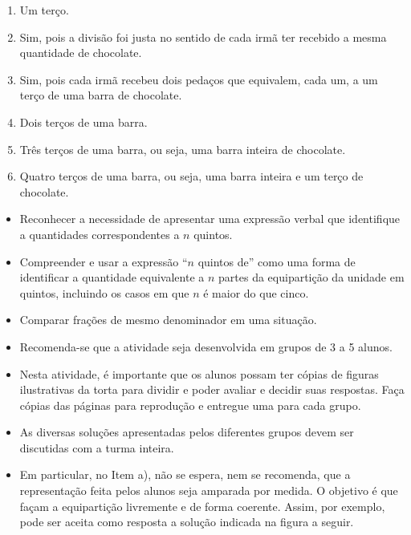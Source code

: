 \begin{multicols}{2}
\begin{solucao}{}{}
\begin{enumerate} [\quad a)] %
    \item  Um terço.
    \item  Sim, pois a divisão foi justa no sentido de cada irmã ter recebido a mesma quantidade de chocolate.
    \item  Sim, pois cada irmã recebeu dois pedaços que equivalem, cada um, a um terço de uma barra de chocolate.
    \item  Dois terços de uma barra.
    \item  Três terços de uma barra, ou seja, uma barra inteira de chocolate.
    \item  Quatro terços de uma barra, ou seja, uma barra inteira e um terço de chocolate.
\end{enumerate} %

\end{solucao}

\newpage
\begin{objetivos}{}{}
  \begin{itemize} %
\item Reconhecer a necessidade de apresentar uma expressão verbal que identifique a quantidades correspondentes a $n$ quintos.
\item Compreender e usar a expressão ``$n$ quintos de'' como uma forma de identificar a quantidade equivalente a $n$ partes da equipartição da unidade em quintos, incluindo os casos em que $n$ é maior do que cinco.
\item Comparar frações de mesmo denominador em uma situação.
\end{itemize} %
\end{objetivos}

\begin{orientacoes}
  \begin{itemize} %
  \item       Recomenda-se que a atividade seja desenvolvida em grupos de 3 a 5 alunos.
  \item       Nesta atividade, é importante que os alunos possam ter cópias de figuras ilustrativas da torta para dividir e poder avaliar e decidir suas respostas. Faça cópias das páginas para reprodução e entregue uma para cada grupo.
  \item       As diversas soluções apresentadas pelos diferentes grupos devem ser discutidas com a turma inteira.
  \item       Em particular, no Item a), não se espera, nem se recomenda, que a representação feita pelos alunos seja amparada por medida. O objetivo é que façam a equipartição livremente e de forma coerente. Assim, por exemplo, pode ser aceita como resposta a solução indicada na figura a seguir.



\end{itemize}
\end{orientacoes}
\end{multicols}

